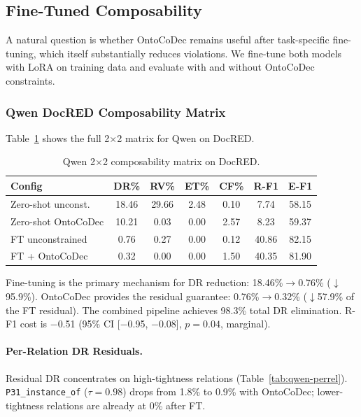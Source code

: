 \documentclass[11pt,a4paper]{article}
\newcommand{\sys}{OntoCoDec}
\newcommand{\pp}{\text{pp}}
\begin{document}
\subsection{Fine-Tuned Composability}
\label{sec:ft-composability}

A natural question is whether \sys{} remains useful after task-specific fine-tuning, which itself substantially reduces violations.
We fine-tune both models with LoRA on training data and evaluate with and without \sys{} constraints.

\subsubsection{Qwen DocRED Composability Matrix}

Table~\ref{tab:qwen-composability} shows the full 2$\times$2 matrix for Qwen on DocRED.

\begin{table}[t]
\centering
\small
\caption{Qwen 2$\times$2 composability matrix on DocRED.}
\label{tab:qwen-composability}
\begin{tabular}{lcccccc}
\toprule
\textbf{Config} & \textbf{DR\%} & \textbf{RV\%} & \textbf{ET\%} & \textbf{CF\%} & \textbf{R-F1} & \textbf{E-F1} \\
\midrule
Zero-shot unconst. & 18.46 & 29.66 & 2.48 & 0.10 & 7.74 & 58.15 \\
Zero-shot \sys{} & 10.21 & 0.03 & 0.00 & 2.57 & 8.23 & 59.37 \\
FT unconstrained & 0.76 & 0.27 & 0.00 & 0.12 & 40.86 & 82.15 \\
FT + \sys{} & 0.32 & 0.00 & 0.00 & 1.50 & 40.35 & 81.90 \\
\bottomrule
\end{tabular}
\end{table}

Fine-tuning is the primary mechanism for DR reduction: 18.46\%$\rightarrow$0.76\% ($\downarrow$95.9\%).
\sys{} provides the residual guarantee: 0.76\%$\rightarrow$0.32\% ($\downarrow$57.9\% of the FT residual).
The combined pipeline achieves 98.3\% total DR elimination.
R-F1 cost is $-$0.51\pp{} (95\% CI [$-$0.95, $-$0.08], $p=0.04$, marginal).

\paragraph{Per-Relation DR Residuals.}
Residual DR concentrates on high-tightness relations (Table~\ref{tab:qwen-perrel}).
\texttt{P31\_instance\_of} ($\tau=0.98$) drops from 1.8\% to 0.9\% with \sys{}; lower-tightness relations are already at 0\% after FT.
\end{document}

